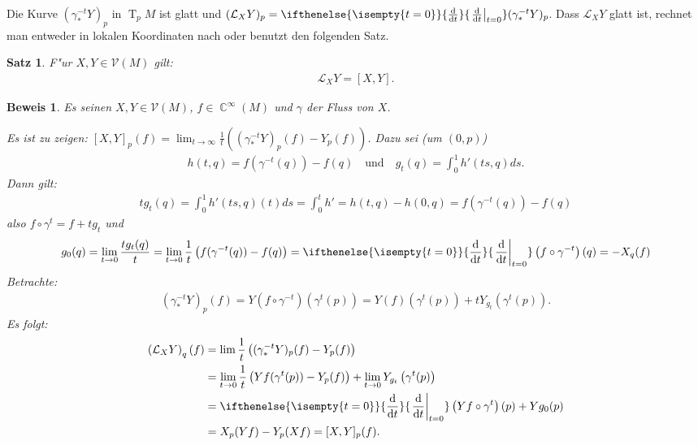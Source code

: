 \documentclass[paper=A4, twoside, chapterprefix=true, bibliography=totoc, headsepline]{scrbook}
\DeclareMathOperator{\C}{\mathbb{C}}
\DeclareMathOperator{\T}{T}         %
\newcommand{\dop}{\mathrm{d}}
\newcommand{\difffrac}[3][]{\ifthenelse{\isempty{#1}}{\frac{\dop #2}{\dop #3}}{\left. \frac{\dop #2}{\dop #3} \right|_{#1}}}
\theoremstyle{plain}
\newtheorem{Satz}[Dfn]{Satz}
\newtheorem{Bem}[Dfn]{Bemerkung}
\theoremstyle{nonumberplain}
\newtheorem{bew}{Beweis}
\theoremstyle{empty}
\theoremstyle{break}
\begin{document}
Die Kurve $(\gamma_{*}^{-t}Y)_p$ in $\T_pM$ ist glatt und $(\mathcal L_XY)_p = \difffrac[t=0]{}{t}(\gamma_{*}^{-t}Y)_p$. Dass $\mathcal L_XY$ glatt ist, rechnet man entweder in lokalen Koordinaten nach oder benutzt den folgenden Satz.

\begin{Satz}
  F"ur $X,Y \in \mathcal V(M)$ gilt:
  \begin{align*}
    \mathcal L_XY = [X,Y].
  \end{align*}
\end{Satz}

\begin{bew}
Es seinen $X,Y \in \mathcal V(M)$, $f \in \C^{\infty}(M)$ und $\gamma$ der Fluss von $X$.

Es ist zu zeigen: $[X,Y]_p(f) = \lim_{t \to \infty} \frac{1}{t}\left((\gamma_{*}^{-t}Y)_p(f)-Y_p(f)\right)$.
Dazu sei (um $(0,p)$)
\begin{align*}
  h(t,q) = f(\gamma^{-t}(q))-f(q) \quad \text{und} \quad g_t(q) = \int_0^1 h'(ts,q)ds.
\end{align*}
Dann gilt:
\begin{align*}
  tg_t(q) = \int_0^1h'(ts,q)(t)ds = \int_0^th' = h(t,q) - h(0,q) = f(\gamma^{-t}(q)) - f(q)
\end{align*}
also $f \circ \gamma^t = f + tg_t$ und 
\begin{align*}
  g_0(q) = \lim_{t \to 0} \frac{tg_t(q)}{t} = \lim_{t \to 0}\frac{1}t\left(f(\gamma^{-t}(q))-f(q)\right) = \difffrac[t=0]{}{t}\left(f \circ \gamma^{-t}\right)(q) = -X_q(f)
\end{align*}
Betrachte:
\begin{align*}
  \left(\gamma_{*}^{-t}Y\right)_p(f) = Y\left(f \circ \gamma^{-t}\right)\left(\gamma^t(p)\right) = Y(f)\left(\gamma^t(p)\right) + tY_{g_t}\left(\gamma^t(p)\right).
\end{align*}
Es folgt:
\begin{align*}
  \left(\mathcal L_XY\right)_q(f) & = \lim \frac{1}t \left((\gamma_{*}^{-t}Y)_p(f) - Y_p(f)\right)\\
& = \lim_{t\to 0} \frac{1}t \left(Yf(\gamma^t(p))-Y_p(f)\right) + \lim_{t\to 0} Y_{g_t}\left(\gamma^t(p)\right)\\
& = \difffrac[t=0]{}{t}\left(Yf \circ \gamma^t\right)(p) + Yg_0(p)\\
& = X_p(Y f) - Y_p(Xf) = [X,Y]_p(f).
\end{align*} 
\end{bew}
\end{document}
